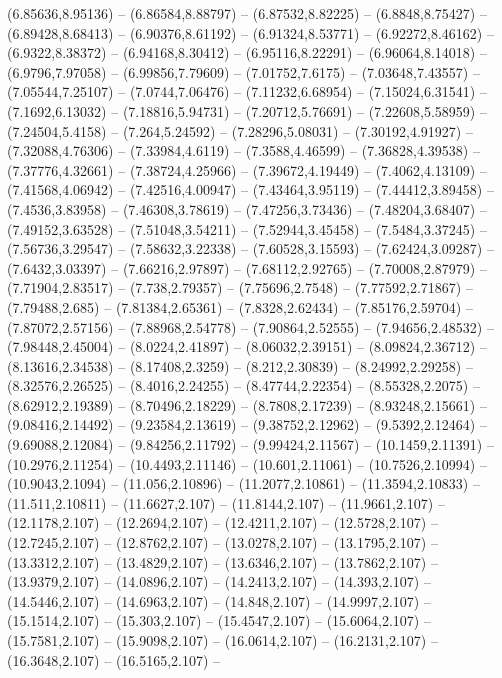  (6.85636,8.95136) -- (6.86584,8.88797) -- (6.87532,8.82225) -- (6.8848,8.75427) -- (6.89428,8.68413) -- (6.90376,8.61192) -- (6.91324,8.53771) -- (6.92272,8.46162) -- (6.9322,8.38372) -- (6.94168,8.30412) -- (6.95116,8.22291) -- (6.96064,8.14018) --
 (6.9796,7.97058) -- (6.99856,7.79609) -- (7.01752,7.6175) -- (7.03648,7.43557) -- (7.05544,7.25107) -- (7.0744,7.06476) -- (7.11232,6.68954) -- (7.15024,6.31541) -- (7.1692,6.13032) -- (7.18816,5.94731) -- (7.20712,5.76691) -- (7.22608,5.58959) --
 (7.24504,5.4158) -- (7.264,5.24592) -- (7.28296,5.08031) -- (7.30192,4.91927) -- (7.32088,4.76306) -- (7.33984,4.6119) -- (7.3588,4.46599) -- (7.36828,4.39538) -- (7.37776,4.32661) -- (7.38724,4.25966) -- (7.39672,4.19449) -- (7.4062,4.13109) --
 (7.41568,4.06942) -- (7.42516,4.00947) -- (7.43464,3.95119) -- (7.44412,3.89458) -- (7.4536,3.83958) -- (7.46308,3.78619) -- (7.47256,3.73436) -- (7.48204,3.68407) -- (7.49152,3.63528) -- (7.51048,3.54211) -- (7.52944,3.45458) -- (7.5484,3.37245) --
 (7.56736,3.29547) -- (7.58632,3.22338) -- (7.60528,3.15593) -- (7.62424,3.09287) -- (7.6432,3.03397) -- (7.66216,2.97897) -- (7.68112,2.92765) -- (7.70008,2.87979) -- (7.71904,2.83517) -- (7.738,2.79357) -- (7.75696,2.7548) -- (7.77592,2.71867) --
 (7.79488,2.685) -- (7.81384,2.65361) -- (7.8328,2.62434) -- (7.85176,2.59704) -- (7.87072,2.57156) -- (7.88968,2.54778) -- (7.90864,2.52555) -- (7.94656,2.48532) -- (7.98448,2.45004) -- (8.0224,2.41897) -- (8.06032,2.39151) -- (8.09824,2.36712) --
 (8.13616,2.34538) -- (8.17408,2.3259) -- (8.212,2.30839) -- (8.24992,2.29258) -- (8.32576,2.26525) -- (8.4016,2.24255) -- (8.47744,2.22354) -- (8.55328,2.2075) -- (8.62912,2.19389) -- (8.70496,2.18229) -- (8.7808,2.17239) -- (8.93248,2.15661) --
 (9.08416,2.14492) -- (9.23584,2.13619) -- (9.38752,2.12962) -- (9.5392,2.12464) -- (9.69088,2.12084) -- (9.84256,2.11792) -- (9.99424,2.11567) -- (10.1459,2.11391) -- (10.2976,2.11254) -- (10.4493,2.11146) -- (10.601,2.11061) -- (10.7526,2.10994) --
 (10.9043,2.1094) -- (11.056,2.10896) -- (11.2077,2.10861) -- (11.3594,2.10833) -- (11.511,2.10811) -- (11.6627,2.107) -- (11.8144,2.107) -- (11.9661,2.107) -- (12.1178,2.107) -- (12.2694,2.107) -- (12.4211,2.107) -- (12.5728,2.107) --
 (12.7245,2.107) -- (12.8762,2.107) -- (13.0278,2.107) -- (13.1795,2.107) -- (13.3312,2.107) -- (13.4829,2.107) -- (13.6346,2.107) -- (13.7862,2.107) -- (13.9379,2.107) -- (14.0896,2.107) -- (14.2413,2.107) -- (14.393,2.107) -- (14.5446,2.107) --
 (14.6963,2.107) -- (14.848,2.107) -- (14.9997,2.107) -- (15.1514,2.107) -- (15.303,2.107) -- (15.4547,2.107) -- (15.6064,2.107) -- (15.7581,2.107) -- (15.9098,2.107) -- (16.0614,2.107) -- (16.2131,2.107) -- (16.3648,2.107) -- (16.5165,2.107) --
